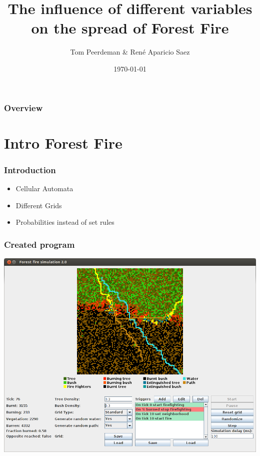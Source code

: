 \documentclass{beamer}
\title[Spread of Forest Fire]{The influence of different variables on the spread of Forest Fire} %
\author{Tom Peerdeman \& Ren\'e Aparicio Saez} %
\date{\today} %
\begin{document}
\begin{frame}
\titlepage %
\end{frame}

\begin{frame}
\frametitle{Overview} %
\tableofcontents %
\end{frame}


\section{Intro Forest Fire} 

\begin{frame}
\frametitle{Introduction}
\begin{itemize}
\item{Cellular Automata}
\item{Different Grids}
\item{Probabilities instead of set rules}
\end{itemize}
\end{frame}

\begin{center}
\begin{frame}
\frametitle{Created program}
\centering
\includegraphics[scale=0.3, interpolate]{imgs/projectcompgui.png}
\end{frame}
\end{center}
\end{document}
